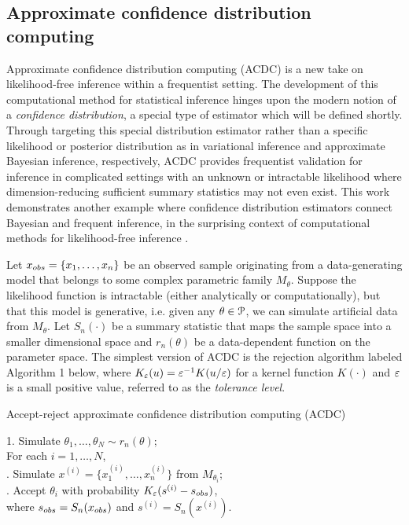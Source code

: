 
\subsection{Approximate confidence distribution computing}
Approximate confidence distribution computing (ACDC) is a new take on likelihood-free inference within a frequentist setting. The development of this computational method for statistical inference hinges upon the modern notion of a {\it confidence distribution}, a special type of estimator which will be defined shortly. Through targeting this special distribution estimator rather than a specific likelihood or posterior distribution as in variational inference and approximate Bayesian inference, respectively, ACDC provides frequentist validation for inference in complicated settings with an unknown or intractable likelihood where dimension-reducing sufficient summary statistics may not even exist. This work demonstrates another example where confidence distribution estimators connect Bayesian and frequent inference, in the surprising context of computational methods for likelihood-free inference \cite{Xie2013, Thornton2022}.  



Let $x_{\rm obs} = \{x_1, \dots, x_n\}$ be an observed sample originating from a data-generating model that belongs to some complex parametric family $M_{\theta}$. Suppose the likelihood function is intractable (either analytically or computationally), but that this model is generative, i.e. given any $\theta \in \P$, we can simulate artificial data from $M_{\theta}$. Let $S_n(\cdot)$ be a summary statistic that maps the sample space into a smaller dimensional space and $r_{n}(\theta)$ be a data-dependent function on the parameter space. The simplest version of ACDC is the rejection algorithm labeled Algorithm 1 below, where $K_{\veps}(u) = \veps^{-1}K(u/ \veps)$ for a kernel function $K(\cdot)$ and $\veps$ is a small positive value, referred to as the {\it tolerance level}. 


\noindent
\hrulefill
\vspace{-3mm}

\begin{algorithm}
\caption{Accept-reject approximate confidence distribution computing (ACDC)}\label{alg:rejACC} 
	\begin{tabbing}
	 1. Simulate $\theta_{1},\ldots,\theta_{N}\sim r_{n}(\theta)$; \\
	 For each $i=1,\ldots,N$, \\
	 . Simulate $x^{(i)}=\{x_{1}^{(i)},\ldots,x_{n}^{(i)}\}$ from $M_{\theta_i}$;\\ 
	 . Accept $\theta_{i}$ with probability $K_{\veps}(s^{(i)}-s_{\rm obs})$,\\ where $s_{{\rm obs}}=S_{n}(x_{\rm obs})$ and $ s^{(i)}=S_{n}(x^{(i)})$.
	\end{tabbing}
\end{algorithm}  

